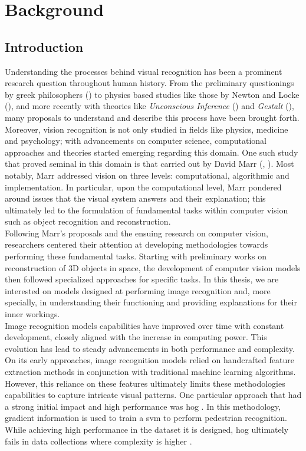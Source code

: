 \chapter{Background}
\label{ch:rel}
\chaptertoc{}
\section{Introduction}
\noindent Understanding the processes behind visual recognition has been a prominent research 
question throughout human history. From the preliminary questionings by greek philosophers 
(\cite{finger2001origins}) to physics based studies like those by Newton and Locke 
(\cite{swenson2010optics}), and more recently with theories like \textit{Unconscious Inference} 
(\cite{gullstrand1909hemholtz}) and \textit{Gestalt} (\cite{wagemans2012century}), many proposals 
to understand and describe this process have been brought forth. Moreover, vision recognition is not 
only studied in fields like physics, medicine and psychology; 
with advancements on computer science, computational approaches and theories started emerging 
regarding this domain. One such study that proved seminal in this domain is that carried out by 
David Marr (\cite{poggio1981marr}, \cite{marr2010vision}). Most notably, Marr addressed vision on 
three levels: computational, algorithmic and implementation. In particular, upon the computational 
level, Marr pondered around issues that the visual system answers and their explanation; this 
ultimately led to the formulation of fundamental tasks within computer vision such as object 
recognition and reconstruction.\\

\noindent Following Marr's proposals and the ensuing research on computer vision, researchers 
centered their attention at developing methodologies towards performing these fundamental tasks.
Starting with preliminary works on reconstruction of 3D objects in space, the development of 
computer vision models then followed specialized approaches for specific tasks. In this thesis, 
we are interested on models designed at performing image recognition and, more specially, in 
understanding their functioning and providing explanations for their inner workings.\\

\noindent Image recognition models capabilities have improved over time with constant development, 
closely aligned with the increase in computing power. This evolution has lead to steady 
advancements in both performance and complexity. On its early approaches, image recognition models 
relied on handcrafted feature extraction methods  in conjunction with traditional machine learning 
algorithms. However, this reliance on these features ultimately limits these methodologies 
capabilities to capture intricate visual patterns.
One particular approach that had a strong initial impact and high performance was \gls{hog} 
\autocite{dalal2005histograms}. In this methodology, gradient information is used to train a 
\gls{svm} to perform pedestrian recognition. While achieving high performance in the dataset it is 
designed, \gls{hog} ultimately fails in data collections where complexity is higher 
\autocite{5975165}.\\


